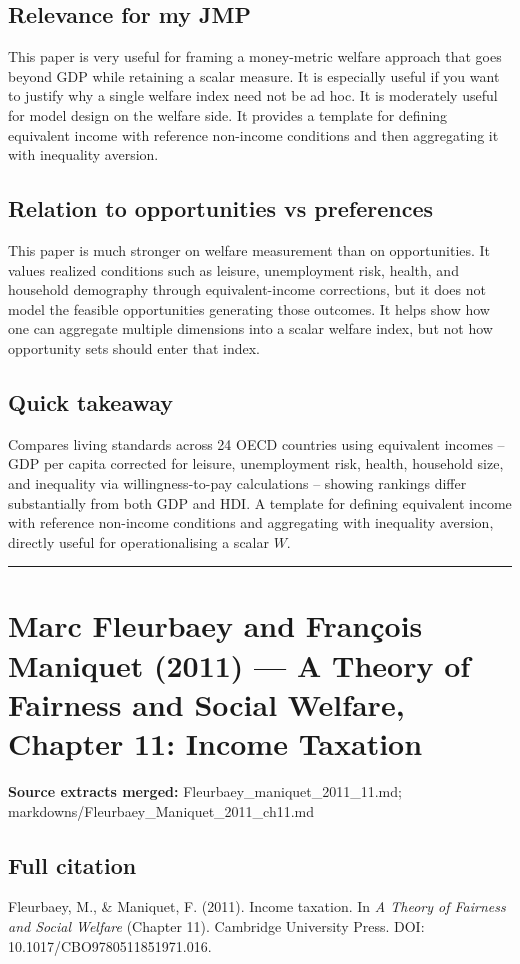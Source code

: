 \documentclass[11pt,a4paper]{article}
\begin{document}
\subsection*{Relevance for my JMP}
This paper is very useful for framing a money-metric welfare approach that goes beyond GDP while retaining a scalar measure. It is especially useful if you want to justify why a single welfare index need not be ad hoc. It is moderately useful for model design on the welfare side. It provides a template for defining equivalent income with reference non-income conditions and then aggregating it with inequality aversion.

\subsection*{Relation to opportunities vs preferences}
This paper is much stronger on welfare measurement than on opportunities. It values realized conditions such as leisure, unemployment risk, health, and household demography through equivalent-income corrections, but it does not model the feasible opportunities generating those outcomes. It helps show how one can aggregate multiple dimensions into a scalar welfare index, but not how opportunity sets should enter that index.

\subsection*{Quick takeaway}
Compares living standards across 24 OECD countries using equivalent incomes -- GDP per capita corrected for leisure, unemployment risk, health, household size, and inequality via willingness-to-pay calculations -- showing rankings differ substantially from both GDP and HDI. A template for defining equivalent income with reference non-income conditions and aggregating with inequality aversion, directly useful for operationalising a scalar $W$.


\medskip\hrule\medskip

\section*{Marc Fleurbaey and François Maniquet (2011) — A Theory of Fairness and Social Welfare, Chapter 11: Income Taxation}

\textbf{Source extracts merged:} Fleurbaey\_maniquet\_2011\_11.md; markdowns/Fleurbaey\_Maniquet\_2011\_ch11.md

\subsection*{Full citation}
Fleurbaey, M., \& Maniquet, F. (2011). Income taxation. In \textit{A Theory of Fairness and Social Welfare} (Chapter 11). Cambridge University Press. DOI: 10.1017/CBO9780511851971.016.
\end{document}
